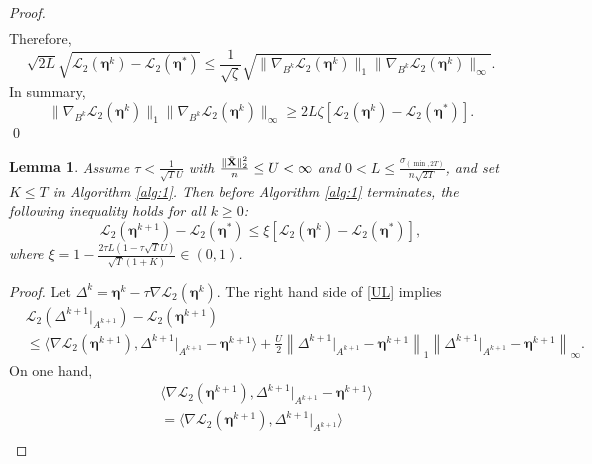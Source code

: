 \documentclass[12pt]{article}
\newtheorem{lemma}{Lemma}
\newcommand{\bX}{{\bf X}}
\newcommand{\bb}{\Delta}
\newcommand{\boldeta}{\boldsymbol{\eta}}
\begin{document}
\begin{appendix}
\begin{proof}
\begin{equation*}
\begin{split}
\end{split}
\end{equation*}
Therefore,
{
\begin{equation*}
\sqrt{2L}\sqrt{\mathcal{L}_2(\boldeta^k)-\mathcal{L}_2(\boldeta^{*})}\leq\frac{1}{\sqrt{\zeta}}\sqrt{\|\nabla_{B^k}\mathcal{L}_2(\boldeta^k)\|_1\|\nabla_{B^k}\mathcal{L}_2(\boldeta^k)\|_{\infty}}.
\end{equation*}
}
In summary,
\begin{equation*}
\|\nabla_{B^k}\mathcal{L}_2(\boldeta^k)\|_1\|\nabla_{B^k}\mathcal{L}_2(\boldeta^k)\|_{\infty}\geq 2L\zeta[\mathcal{L}_2(\boldeta^k)-\mathcal{L}_2(\boldeta^*)].
\end{equation*}
\qed
\end{proof}
\begin{lemma}\label{L9.2}
Assume $\tau<\frac{1}{ \sqrt{T}U}$  with $\frac{\|\bar{\bX}\|_2^2}{n}\leq U<\infty$
and $0<L\leq\frac{\sigma_{(\min,2T)}}{n\sqrt{2T}}$,
and set $K\leq T$ in Algorithm \ref{alg:1}.
 Then before Algorithm \ref{alg:1} terminates, the following inequality holds for all $k\geq0$:
\begin{equation*}
\mathcal{L}_2(\boldeta^{k+1})-\mathcal{L}_2(\boldeta^*)\leq\xi[\mathcal{L}_2(\boldeta^k)-\mathcal{L}_2(\boldeta^*)],
\end{equation*}
where $\xi=1-\frac{2\tau L(1-\tau \sqrt{T}U)}{ \sqrt{T}(1+K)}\in(0,1)$.
\end{lemma}
\begin{proof}
Let $\bb^{k}=\boldeta^k-\tau \nabla \mathcal{L}_2(\boldeta^{k})$.
The right hand side of  \eqref{UL} implies
\begin{equation*}
\begin{split}
&\mathcal{L}_2(\bb^{k+1}|_{A^{k+1}})-\mathcal{L}_2(\boldeta^{k+1})\\
&\leq\langle\nabla \mathcal{L}_2(\boldeta^{k+1}),\bb^{k+1}|_{A^{k+1}}-\boldeta^{k+1}\rangle+\frac{U}{2}\left\|\bb^{k+1}|_{A^{k+1}}-\boldeta^{k+1}\right\|_1\left\|\bb^{k+1}|_{A^{k+1}}-\boldeta^{k+1}\right\|_{\infty}.
\end{split}
\end{equation*}
On one hand,
\begin{equation*}
\begin{split}
&\langle\nabla \mathcal{L}_2(\boldeta^{k+1}), \bb^{k+1}|_{A^{k+1}}-\boldeta^{k+1}\rangle\\
&=\langle\nabla \mathcal{L}_2(\boldeta^{k+1}), \bb^{k+1}|_{A^{k+1}}\rangle\\

\end{split}
\end{equation*}
\end{proof}
\end{appendix}
\end{document}
